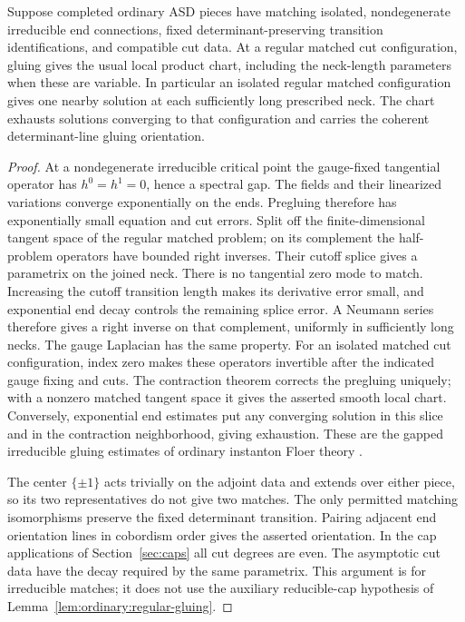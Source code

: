 \begin{lemma}\label{lem:caps:irreducible-gluing}
Suppose completed ordinary ASD pieces have matching isolated,
nondegenerate irreducible end connections, fixed determinant-preserving
transition identifications, and compatible cut data.  At a regular
matched cut configuration, gluing gives the usual local product chart,
including the neck-length parameters when these are variable.  In
particular an isolated regular matched configuration gives one nearby
solution at each sufficiently long prescribed neck.  The chart exhausts
solutions converging to that configuration and carries the coherent
determinant-line gluing orientation.
\end{lemma}
\begin{proof}
At a nondegenerate irreducible critical point the gauge-fixed tangential
operator has $h^0=h^1=0$, hence a spectral gap.  The fields and their
linearized variations converge exponentially on the ends.  Pregluing
therefore has exponentially small equation and cut errors.  Split off
the finite-dimensional tangent space of the regular matched problem;
on its complement the half-problem operators have bounded right
inverses.  Their cutoff splice gives a parametrix on the joined neck.
There is no tangential zero mode to match.  Increasing the cutoff
transition length makes its derivative error small, and exponential
end decay controls the remaining splice error.  A Neumann series
therefore gives a right inverse on that complement, uniformly in
sufficiently long necks.  The gauge Laplacian has the same property.
For an isolated matched cut configuration, index zero makes these
operators invertible after the indicated gauge fixing and cuts.
The contraction theorem corrects the pregluing uniquely; with a
nonzero matched tangent space it gives the asserted smooth local chart.
Conversely, exponential end estimates put any converging solution in
this slice and in the contraction neighborhood, giving exhaustion.
These are the gapped irreducible gluing estimates of ordinary instanton
Floer theory \cite{DonaldsonKronheimer1990,Donaldson2002}.

The center $\{\pm1\}$ acts trivially on the adjoint data and extends
over either piece, so its two representatives do not give two matches.
The only permitted matching isomorphisms preserve the fixed determinant
transition.  Pairing adjacent end orientation lines in cobordism order
gives the asserted orientation.  In the cap applications of
Section~\ref{sec:caps} all cut degrees are even.  The asymptotic cut data have the decay required by the same
parametrix.
This argument is for irreducible matches; it does not use the
auxiliary reducible-cap hypothesis of
Lemma~\ref{lem:ordinary:regular-gluing}.
\end{proof}


